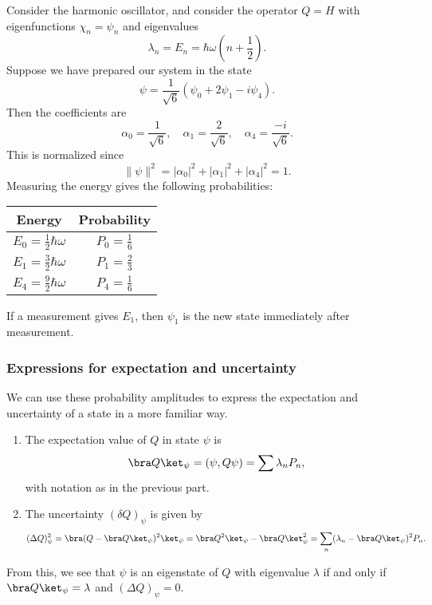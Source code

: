 \documentclass[a4paper]{article}
\begin{document}
\begin{eg}
  Consider the harmonic oscillator, and consider the operator $Q = H$ with eigenfunctions $\chi_n = \psi_n$ and eigenvalues
  \[
    \lambda_n = E_n = \hbar \omega \left(n + \frac{1}{2}\right).
  \]
  Suppose we have prepared our system in the state
  \[
    \psi = \frac{1}{\sqrt{6}}(\psi_0 + 2\psi_1 - i \psi_4).
  \]
  Then the coefficients are
  \[
    \alpha_0 = \frac{1}{\sqrt{6}},\quad \alpha_1 = \frac{2}{\sqrt{6}},\quad \alpha_4 = \frac{-i}{\sqrt{6}}.
  \]
  This is normalized since
  \[
    \|\psi\|^2 = |\alpha_0|^2 + |\alpha_1|^2 + |\alpha_4|^2 = 1.
  \]
  Measuring the energy gives the following probabilities:
  \begin{center}
    \begin{tabular}{cc}
      \toprule
      \textbf{Energy} & \textbf{Probability}\\
      \midrule
      $\displaystyle E_0 = \frac{1}{2} \hbar \omega$ & $\displaystyle P_0 = \frac{1}{6}$\\\addlinespace
      $\displaystyle E_1 = \frac{3}{2} \hbar \omega$ & $\displaystyle P_1 = \frac{2}{3}$\\\addlinespace
      $\displaystyle E_4 = \frac{9}{2} \hbar \omega$ & $\displaystyle P_4 = \frac{1}{6}$\\
      \bottomrule
    \end{tabular}
  \end{center}
  If a measurement gives $E_1$, then $\psi_1$ is the new state immediately after measurement.
\end{eg}

\subsubsection*{Expressions for expectation and uncertainty}
We can use these probability amplitudes to express the expectation and uncertainty of a state in a more familiar way.
\begin{prop}\leavevmode
  \begin{enumerate}
    \item The expectation value of $Q$ in state $\psi$ is
      \[
        \bra Q\ket_\psi = (\psi, Q\psi) = \sum \lambda_n P_n,
      \]
      with notation as in the previous part.
    \item The uncertainty $(\delta Q)_\psi$ is given by
      \[
        (\Delta Q)^2_\psi = \bra (Q - \bra Q\ket_\psi)^2\ket_\psi = \bra Q^2\ket_\psi - \bra Q\ket_\psi^2 = \sum_n (\lambda_n - \bra Q\ket_\psi)^2 P_n.
      \]
  \end{enumerate}
\end{prop}
From this, we see that $\psi$ is an eigenstate of $Q$ with eigenvalue $\lambda$ if and only if $\bra Q\ket_\psi = \lambda$ and $(\Delta Q)_\psi = 0$.
\end{document}
